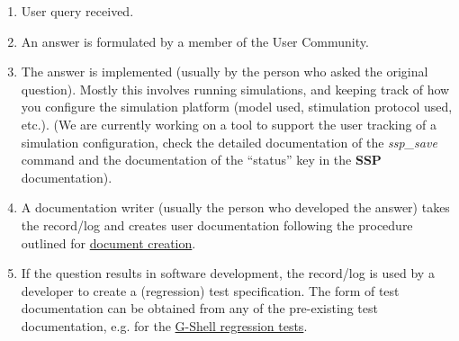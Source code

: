 \documentclass[12pt]{article}
\begin{document}
\begin{enumerate}
\item User query received.
\item An answer is formulated by a member of the User Community.
\item The answer is implemented (usually by the person who asked the
  original question).  Mostly this involves running simulations, and
  keeping track of how you configure the simulation platform (model used, stimulation protocol used, etc.).  (We are currently working
  on a tool to support the user tracking of a simulation
  configuration, check the detailed documentation of the {\it ssp\_save}
  command and the documentation of the ``status'' key in the {\bf SSP}
  documentation).
\item A documentation writer (usually the person who developed the
  answer) takes the record/log and creates user documentation
  following the procedure outlined for
  \href{../document-create/document-create.tex}{document creation}.
\item If the question results in software development, the record/log
  is used by a developer to create a (regression) test specification.
  The form of test documentation can be obtained from any of the
  pre-existing test documentation, e.g. for the
  \href{../tests-gshell/tests-gshell.tex}{G-Shell regression tests}.
\end{enumerate}
\end{document}
